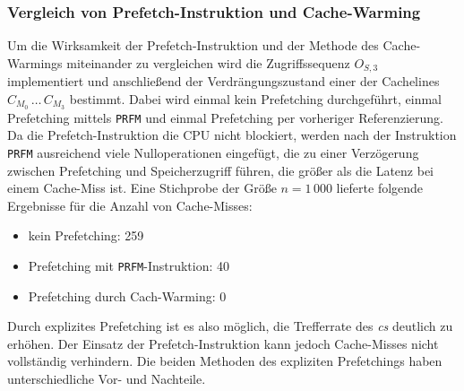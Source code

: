 \documentclass[]{scrbook}
\begin{document}
\subsubsection{Vergleich von Prefetch-Instruktion und Cache-Warming}

Um die Wirksamkeit der Prefetch-Instruktion und der Methode des Cache-Warmings miteinander zu vergleichen wird die Zugriffssequenz $O_{S,3}$ implementiert und anschließend der Verdrängungszustand einer der Cachelines $C_{M_0}\,\dots\,C_{M_3}$ bestimmt.
Dabei wird einmal kein Prefetching durchgeführt, einmal Prefetching mittels \texttt{PRFM} und einmal Prefetching per vorheriger Referenzierung.
\\
Da die Prefetch-Instruktion die CPU nicht blockiert, werden nach der Instruktion \texttt{PRFM} ausreichend viele Nulloperationen eingefügt, die zu einer Verzögerung zwischen Prefetching und Speicherzugriff führen, die größer als die Latenz bei einem Cache-Miss ist.
Eine Stichprobe der Größe $n=1\,000$ lieferte folgende Ergebnisse für die Anzahl von Cache-Misses:

\begin{itemize}
	\item kein Prefetching: 259
	\item Prefetching mit \texttt{PRFM}-Instruktion: 40
	\item Prefetching durch Cach-Warming: 0
\end{itemize}

Durch explizites Prefetching ist es also möglich, die Trefferrate des \textsl{\gls{c}s} deutlich zu erhöhen.
Der Einsatz der Prefetch-Instruktion kann jedoch Cache-Misses nicht vollständig verhindern.
Die beiden Methoden des expliziten Prefetchings haben unterschiedliche Vor- und Nachteile.

\clearpage
\end{document}
